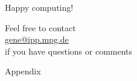 \documentclass[10pt]{beamer}
\begin{document}
\begin{frame}[plain]

\vspace{3cm}

\begin{exampleblock}{}
 \begin{center}
 \LARGE
 Happy computing!
 \end{center}
\end{exampleblock}

\vspace{3cm}

\begin{center}
\begin{minipage}{0.5\textwidth}
\begin{exampleblock}{}
\begin{center}
Feel free to contact\\
\href{mailto:gene@ipp.mpg.de}{gene@ipp.mpg.de}\\
if you have questions or comments
\end{center}
\end{exampleblock}
\end{minipage}
\end{center}

\end{frame}


\begin{frame}[plain]

\begin{exampleblock}{}
 \begin{center}
 \LARGE
 Appendix
 \end{center}
\end{exampleblock}

\end{frame}

\end{document}
